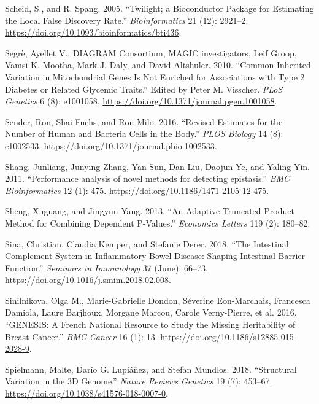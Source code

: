 \documentclass[
  11pt,
]{env/yjiao}
\newlength{\cslhangindent}
\newenvironment{cslreferences}%
  {\setlength{\parindent}{0pt}%
  \everypar{\setlength{\hangindent}{\cslhangindent}}\ignorespaces}%
  {\par}
\begin{document}
\begin{cslreferences}
\leavevmode\hypertarget{ref-scheid_twilight_2005}{}%
Scheid, S., and R. Spang. 2005. ``Twilight; a Bioconductor Package for Estimating the Local False Discovery Rate.'' \emph{Bioinformatics} 21 (12): 2921--2. \url{https://doi.org/10.1093/bioinformatics/bti436}.

\leavevmode\hypertarget{ref-segre_common_2010}{}%
Segrè, Ayellet V., DIAGRAM Consortium, MAGIC investigators, Leif Groop, Vamsi K. Mootha, Mark J. Daly, and David Altshuler. 2010. ``Common Inherited Variation in Mitochondrial Genes Is Not Enriched for Associations with Type 2 Diabetes or Related Glycemic Traits.'' Edited by Peter M. Visscher. \emph{PLoS Genetics} 6 (8): e1001058. \url{https://doi.org/10.1371/journal.pgen.1001058}.

\leavevmode\hypertarget{ref-sender_revised_2016}{}%
Sender, Ron, Shai Fuchs, and Ron Milo. 2016. ``Revised Estimates for the Number of Human and Bacteria Cells in the Body.'' \emph{PLOS Biology} 14 (8): e1002533. \url{https://doi.org/10.1371/journal.pbio.1002533}.

\leavevmode\hypertarget{ref-Shang2011}{}%
Shang, Junliang, Junying Zhang, Yan Sun, Dan Liu, Daojun Ye, and Yaling Yin. 2011. ``Performance analysis of novel methods for detecting epistasis.'' \emph{BMC Bioinformatics} 12 (1): 475. \url{https://doi.org/10.1186/1471-2105-12-475}.

\leavevmode\hypertarget{ref-sheng2013adaptive}{}%
Sheng, Xuguang, and Jingyun Yang. 2013. ``An Adaptive Truncated Product Method for Combining Dependent P-Values.'' \emph{Economics Letters} 119 (2): 180--82.

\leavevmode\hypertarget{ref-sina_intestinal_2018}{}%
Sina, Christian, Claudia Kemper, and Stefanie Derer. 2018. ``The Intestinal Complement System in Inflammatory Bowel Disease: Shaping Intestinal Barrier Function.'' \emph{Seminars in Immunology} 37 (June): 66--73. \url{https://doi.org/10.1016/j.smim.2018.02.008}.

\leavevmode\hypertarget{ref-sinilnikova_genesis:_2016}{}%
Sinilnikova, Olga M., Marie-Gabrielle Dondon, Séverine Eon-Marchais, Francesca Damiola, Laure Barjhoux, Morgane Marcou, Carole Verny-Pierre, et al. 2016. ``GENESIS: A French National Resource to Study the Missing Heritability of Breast Cancer.'' \emph{BMC Cancer} 16 (1): 13. \url{https://doi.org/10.1186/s12885-015-2028-9}.

\leavevmode\hypertarget{ref-spielmann_structural_2018}{}%
Spielmann, Malte, Darío G. Lupiáñez, and Stefan Mundlos. 2018. ``Structural Variation in the 3D Genome.'' \emph{Nature Reviews Genetics} 19 (7): 453--67. \url{https://doi.org/10.1038/s41576-018-0007-0}.


\end{cslreferences}
\end{document}
